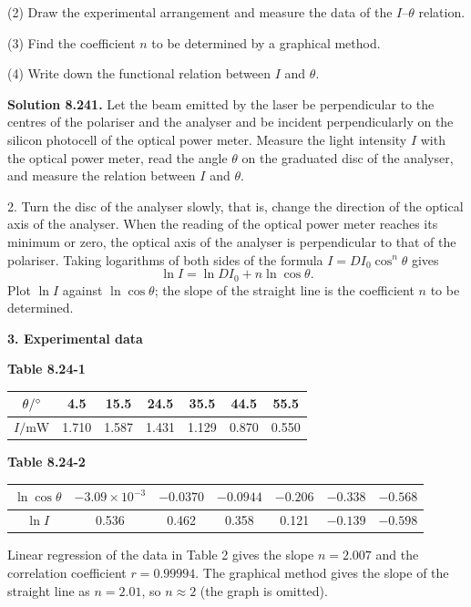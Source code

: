 (2) Draw the experimental arrangement and measure the data of the $I$--$\theta$ relation.

(3) Find the coefficient $n$ to be determined by a graphical method.

(4) Write down the functional relation between $I$ and $\theta$.

\textbf{Solution 8.24}\quad \textbf{1.} Let the beam emitted by the laser be perpendicular to the centres of the polariser and the analyser and be incident perpendicularly on the silicon photocell of the optical power meter. Measure the light intensity $I$ with the optical power meter, read the angle $\theta$ on the graduated disc of the analyser, and measure the relation between $I$ and $\theta$.

2. Turn the disc of the analyser slowly, that is, change the direction of the optical axis of the analyser. When the reading of the optical power meter reaches its minimum or zero, the optical axis of the analyser is perpendicular to that of the polariser. Taking logarithms of both sides of the formula $I=DI_0\cos^n\theta$ gives
\[
\ln I=\ln DI_0+n\ln\cos\theta.
\]
Plot $\ln I$ against $\ln\cos\theta$; the slope of the straight line is the coefficient $n$ to be determined.

\textbf{3. Experimental data}

\begin{center}
\textbf{Table 8.24-1}\\[3pt]
\begin{tabular}{ccccccc}
\toprule
$\theta/^{\circ}$ & 4.5 & 15.5 & 24.5 & 35.5 & 44.5 & 55.5 \\
\midrule
$I/\mathrm{mW}$ & 1.710 & 1.587 & 1.431 & 1.129 & 0.870 & 0.550 \\
\bottomrule
\end{tabular}
\end{center}

\begin{center}
\textbf{Table 8.24-2}\\[3pt]
\begin{tabular}{ccccccc}
\toprule
$\ln\cos\theta$ & $-3.09\times10^{-3}$ & $-0.0370$ & $-0.0944$ & $-0.206$ & $-0.338$ & $-0.568$ \\
\midrule
$\ln I$ & 0.536 & 0.462 & 0.358 & 0.121 & $-0.139$ & $-0.598$ \\
\bottomrule
\end{tabular}
\end{center}

Linear regression of the data in Table 2 gives the slope $n=2.007$ and the correlation coefficient $r=0.99994$. The graphical method gives the slope of the straight line as $n=2.01$, so $n\approx2$ (the graph is omitted).

